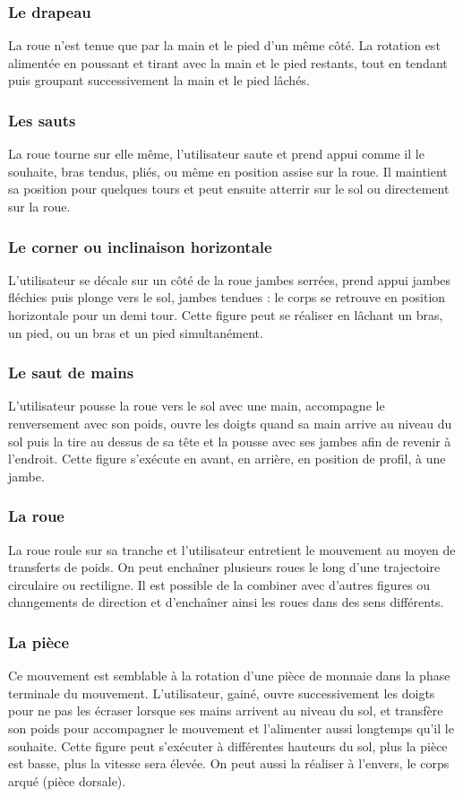 \subsubsection{Le drapeau}
La roue n'est tenue que par la main et le pied d'un même côté. La rotation est alimentée en poussant et tirant avec la main et le pied restants, tout en tendant puis groupant successivement la main et le pied lâchés.

\subsubsection{Les sauts}
La roue tourne sur elle même, l'utilisateur saute et prend appui comme il le souhaite, bras tendus, pliés, ou même en position assise sur la roue. Il maintient sa position pour quelques tours et peut ensuite atterrir sur le sol ou directement sur la roue.

\subsubsection{Le corner ou inclinaison horizontale}
L'utilisateur se décale sur un côté de la roue jambes serrées, prend appui jambes fléchies puis plonge vers le sol, jambes tendues : le corps se retrouve en position horizontale pour un demi tour. Cette figure peut se réaliser en lâchant un bras, un pied, ou un bras et un pied simultanément.

\subsubsection{Le saut de mains}
L'utilisateur pousse la roue vers le sol avec une main, accompagne le renversement avec son poids, ouvre les doigts quand sa main arrive au niveau du sol puis la tire au dessus de sa tête et la pousse avec ses jambes afin de revenir à l'endroit. Cette figure s'exécute en avant, en arrière, en position de profil, à une jambe.

\subsubsection{La roue}
La roue roule sur sa tranche et l'utilisateur entretient le mouvement au moyen de transferts de poids. On peut enchaîner plusieurs roues le long d'une trajectoire circulaire ou rectiligne. Il est possible de la combiner avec d'autres figures ou changements de direction et d'enchaîner ainsi les roues dans des sens différents.

\subsubsection{La pièce}
Ce mouvement est semblable à la rotation d'une pièce de monnaie dans la phase terminale du mouvement. L'utilisateur, gainé, ouvre successivement les doigts pour ne pas les écraser lorsque ses mains arrivent au niveau du sol, et transfère son poids pour accompagner le mouvement et l'alimenter aussi longtemps qu'il le souhaite. Cette figure peut s'exécuter à différentes hauteurs du sol, plus la pièce est basse, plus la vitesse sera élevée. On peut aussi la réaliser à l'envers, le corps arqué (pièce dorsale).

